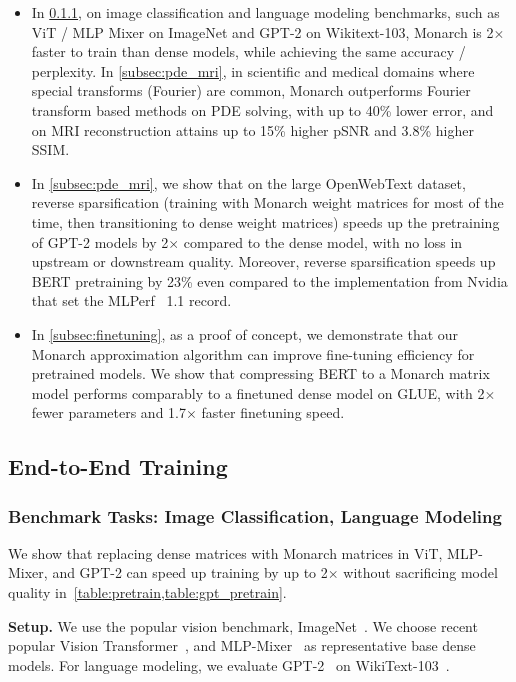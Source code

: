 \begin{itemize}[leftmargin=*,nosep,nolistsep,noitemsep]
\item In \ref{subsec:benchmark_tasks}, on image classification and language modeling benchmarks, such as ViT / MLP Mixer on ImageNet and GPT-2 on Wikitext-103, Monarch is 2$\times$ faster to train than dense models, while achieving the same accuracy / perplexity. In \ref{subsec:pde_mri}, in scientific and medical domains where special transforms (Fourier) are common, Monarch outperforms Fourier transform based methods on PDE solving, with up to 40\% lower error, and on MRI reconstruction attains up to 15\% higher pSNR and 3.8\% higher SSIM.
\item In \ref{subsec:pde_mri}, we show that on the large OpenWebText dataset, reverse sparsification (training with Monarch weight matrices for most of the time, then transitioning to dense weight matrices) speeds up the pretraining of GPT-2 models by 2$\times$ compared to the dense model, with no loss in upstream or downstream quality. Moreover, reverse sparsification speeds up BERT pretraining by 23\% even compared to the implementation from Nvidia that set the MLPerf~\citep{mattson2020mlperf} 1.1 record.
\item In \ref{subsec:finetuning}, as a proof of concept, we demonstrate that our Monarch approximation algorithm can improve fine-tuning efficiency for pretrained models. We show that compressing BERT to a Monarch matrix model performs comparably to a finetuned dense model on GLUE, with 2$\times$ fewer parameters and 1.7$\times$ faster finetuning speed.
\end{itemize}

\subsection{End-to-End Training}
\label{subsec:e2e_training}
\subsubsection{Benchmark Tasks: Image Classification, Language Modeling}
\label{subsec:benchmark_tasks}

We show that replacing dense matrices with Monarch matrices in ViT, MLP-Mixer, and GPT-2 can speed up training by up to 2$\times$ without sacrificing model quality in~\ref{table:pretrain,table:gpt_pretrain}.

\textbf{Setup.} We use the popular vision benchmark, ImageNet~\citep{deng2009imagenet}. We choose recent popular Vision Transformer~\citep{dosovitskiy2020image}, and MLP-Mixer~\citep{tolstikhin2021mlp} as representative base dense models. For language modeling, we evaluate GPT-2~\citep{radford2019language} on WikiText-103~\citep{merity2016pointer}.

